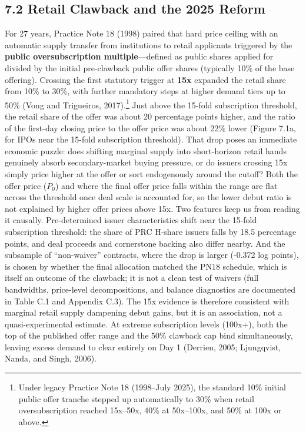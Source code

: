 \documentclass[11pt,letterpaper]{article}
\begin{document}
\subsection*{\texorpdfstring{7.2 Retail Clawback and the 2025 Reform}{7.2 Retail Clawback and the 2025 Reform}}
For 27 years, Practice Note 18 (1998) paired that hard price ceiling with an automatic supply transfer from institutions to retail applicants triggered by the \textbf{public oversubscription multiple}—defined as public shares applied for divided by the initial pre-clawback public offer shares (typically 10\% of the base offering). Crossing the first statutory trigger at \textbf{15x} expanded the retail share from 10\% to 30\%, with further mandatory steps at higher demand tiers up to 50\% (Vong and Trigueiros, 2017).\footnote{Under legacy Practice Note 18 (1998–July 2025), the standard 10\% initial public offer tranche stepped up automatically to 30\% when retail oversubscription reached 15x–50x, 40\% at 50x–100x, and 50\% at 100x or above.} Just above the 15-fold subscription threshold, the retail share of the offer was about 20 percentage points higher, and the ratio of the first-day closing price to the offer price was about 22\% lower (Figure 7.1a, for IPOs near the 15-fold subscription threshold). That drop poses an immediate economic puzzle: does shifting marginal supply into short-horizon retail hands genuinely absorb secondary-market buying pressure, or do issuers crossing 15x simply price higher at the offer or sort endogenously around the cutoff? Both the offer price ($P_0$) and where the final offer price falls within the range are flat across the threshold once deal scale is accounted for, so the lower debut ratio is not explained by higher offer prices above 15x. Two features keep us from reading it causally. Pre-determined issuer characteristics shift near the 15-fold subscription threshold: the share of PRC H-share issuers falls by 18.5 percentage points, and deal proceeds and cornerstone backing also differ nearby. And the subsample of “non-waiver” contracts, where the drop is larger (-0.372 log points), is chosen by whether the final allocation matched the PN18 schedule, which is itself an outcome of the clawback; it is not a clean test of waivers (full bandwidths, price-level decompositions, and balance diagnostics are documented in Table C.1 and Appendix C.3). The 15x evidence is therefore consistent with marginal retail supply dampening debut gains, but it is an association, not a quasi-experimental estimate. At extreme subscription levels (100x+), both the top of the published offer range and the 50\% clawback cap bind simultaneously, leaving excess demand to clear entirely on Day 1 (Derrien, 2005; Ljungqvist, Nanda, and Singh, 2006).
\end{document}
